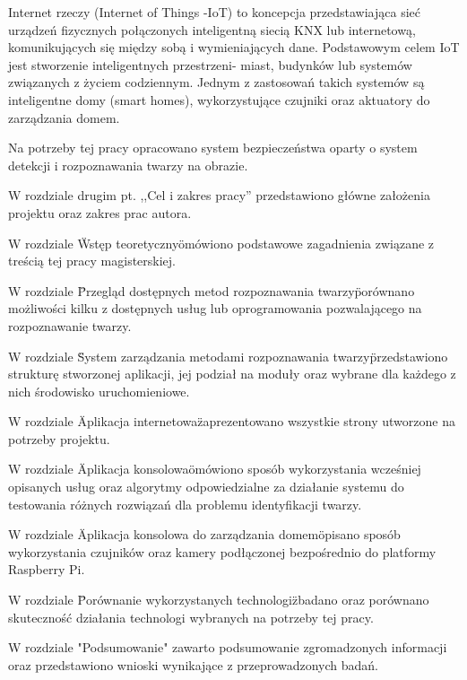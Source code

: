 Internet rzeczy (Internet of Things -IoT) to koncepcja przedstawiająca sieć urządzeń fizycznych połączonych inteligentną siecią KNX lub internetową, komunikujących się między sobą i wymieniających dane. Podstawowym celem IoT jest stworzenie inteligentnych przestrzeni- miast, budynków lub systemów związanych z życiem codziennym. Jednym z zastosowań takich systemów są inteligentne domy (smart homes), wykorzystujące czujniki oraz aktuatory do zarządzania domem.

Na potrzeby tej pracy opracowano system bezpieczeństwa oparty o system detekcji i rozpoznawania twarzy na obrazie.


W rozdziale drugim pt. ,,Cel i zakres pracy'' przedstawiono główne założenia projektu oraz zakres prac autora.

W rozdziale \"Wstęp teoretyczny\" omówiono podstawowe zagadnienia związane z treścią tej pracy magisterskiej.

W rozdziale \"Przegląd dostępnych metod rozpoznawania twarzy\" porównano możliwości kilku z dostępnych usług lub oprogramowania pozwalającego na rozpoznawanie twarzy.

W rozdziale \"System zarządzania metodami rozpoznawania twarzy\" przedstawiono strukturę stworzonej aplikacji, jej podział na moduły oraz wybrane dla każdego z nich środowisko uruchomieniowe.

W rozdziale \"Aplikacja internetowa\" zaprezentowano wszystkie strony utworzone na potrzeby projektu.

W rozdziale \"Aplikacja konsolowa\" omówiono sposób wykorzystania wcześniej opisanych usług oraz algorytmy odpowiedzialne za działanie systemu do testowania różnych rozwiązań dla problemu identyfikacji twarzy.

W rozdziale \"Aplikacja konsolowa do zarządzania domem\" opisano sposób wykorzystania czujników oraz kamery podłączonej bezpośrednio do platformy Raspberry Pi.

W rozdziale \"Porównanie wykorzystanych technologi\" zbadano oraz porównano skuteczność działania technologi wybranych na potrzeby tej pracy.

W rozdziale "Podsumowanie" zawarto podsumowanie zgromadzonych informacji oraz przedstawiono wnioski wynikające z przeprowadzonych badań.



